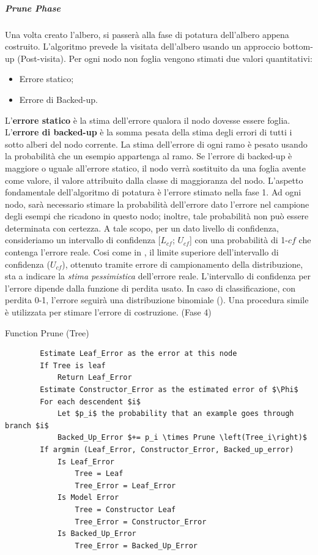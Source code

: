 \subparagraph{Prune Phase}
	Una volta creato l'albero, si passerà alla fase di potatura dell'albero appena costruito. L'algoritmo prevede la visitata dell'albero usando un approccio bottom-up (Post-visita). Per ogni nodo non foglia vengono stimati due valori quantitativi: 
\begin{itemize}
	\item Errore statico;
	\item Errore di Backed-up.
\end{itemize}
L'\textbf{errore statico} è la stima dell'errore qualora il nodo dovesse essere foglia.
L'\textbf{errore di backed-up} è la somma pesata della stima degli errori di tutti i sotto alberi del nodo corrente. La stima dell'errore di ogni ramo è pesato usando la probabilità che un esempio appartenga al ramo. Se l'errore di backed-up è maggiore o uguale all'errore statico, il nodo verrà sostituito da una foglia avente come valore, il valore attribuito dalla classe di maggioranza del nodo. L'aspetto fondamentale dell'algoritmo di potatura è l'errore stimato nella fase 1. Ad ogni nodo, sarà necessario stimare la probabilità dell'errore dato l'errore nel campione degli esempi che ricadono in questo nodo; inoltre, tale probabilità non può essere determinata con certezza. A tale scopo, per un dato livello di confidenza, consideriamo un intervallo di confidenza [$L_{cf}$; $U_{cf}$] con una probabilità di 1-$cf$ che contenga l'errore reale. Cosi come in \cite{Quinlan:1993a}, il limite superiore dell'intervallo di confidenza ($U_{cf}$), ottenuto tramite errore di campionamento della distribuzione, sta a indicare la \emph{stima pessimistica} dell'errore reale. L'intervallo di confidenza per l'errore dipende dalla funzione di perdita usato. In caso di classificazione, con perdita 0-1, l'errore seguirà una distribuzione binomiale (\cite{mitchellbook}).
Una procedura simile è utilizzata per stimare l'errore di costruzione. (Fase 4)


\begin{algorithm}
	\caption{Function Prune (Tree)}
	\begin{lstlisting}
		Estimate Leaf_Error as the error at this node
		If Tree is leaf 
			Return Leaf_Error
		Estimate Constructor_Error as the estimated error of $\Phi$
		For each descendent $i$
			Let $p_i$ the probability that an example goes through branch $i$
			Backed_Up_Error $+= p_i \times Prune \left(Tree_i\right)$
		If argmin (Leaf_Error, Constructor_Error, Backed_up_error)
			Is Leaf_Error
				Tree = Leaf
				Tree_Error = Leaf_Error
			Is Model Error
				Tree = Constructor Leaf
				Tree_Error = Constructor_Error
			Is Backed_Up_Error
				Tree_Error = Backed_Up_Error
	\end{lstlisting}
\end{algorithm}

